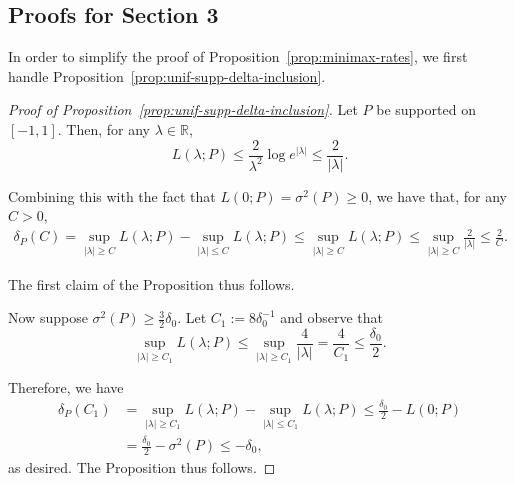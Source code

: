 \documentclass{article}
\theoremstyle{definition}
\newcommand{\1}{\mathbbm{1}}
\begin{document}
\subsection{Proofs for Section 3}
In order to simplify the proof of Proposition~\ref{prop:minimax-rates}, we first handle Proposition~\ref{prop:unif-supp-delta-inclusion}.
\begin{proof}[Proof of Proposition~\ref{prop:unif-supp-delta-inclusion}]
    Let $P$ be supported on $[-1, 1]$. Then, for any $\lambda \in \mathbb{R}$, 
    \[
    L(\lambda; P) \leq \frac{2}{\lambda^2} \log e^{ |\lambda|} \leq \frac{2}{|\lambda|}.
    \]

    Combining this with the fact that $L(0 ; P) = \sigma^2(P) \geq 0$, we have that, for any $C > 0$,
    \begin{align*}
    \delta_P(C) = \sup_{|\lambda| \geq C} L(\lambda; P) - \sup_{| \lambda | \leq C} L(\lambda; P) 
    \leq \sup_{|\lambda| \geq C} L(\lambda ; P) \leq \sup_{|\lambda| \geq C} \frac{2}{|\lambda|} \leq \frac{2}{C}.
    \end{align*}
    
   The first claim of the Proposition thus follows. 
   
   
   Now suppose $\sigma^2(P) \geq \frac32\delta_0$. Let $C_1 := 8 \delta_0^{-1}$ and observe that
   \[
   \sup_{|\lambda| \geq C_1} L(\lambda; P) \leq \sup_{|\lambda| \geq C_1} \frac{4}{|\lambda|}  = \frac{4}{C_1} \leq \frac{\delta_0}{2}.
   \]

    Therefore, we have 
    \begin{align*}
    \delta_P(C_1) &= \sup_{|\lambda| \geq C_1} L(\lambda ; P) - \sup_{|\lambda| \leq C_1} L(\lambda ; P) \leq \frac{\delta_0}{2} - L(0 ; P) \\
    &= \frac{\delta_0}{2} - \sigma^2(P) \leq - \delta_0,
    \end{align*}
as desired. The Proposition thus follows. 
\end{proof}
\end{document}
